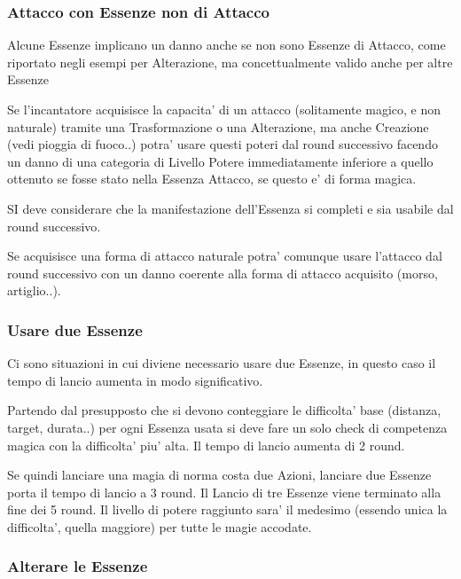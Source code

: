 \documentclass[a4paper,11pt,twoside,openany]{dndbook}
\begin{document}
\label{altre-regole}

\subsubsection{Attacco con Essenze non di Attacco}

Alcune Essenze implicano un danno anche se non sono Essenze di Attacco, come riportato negli esempi per Alterazione, ma concettualmente valido anche per altre Essenze

Se l'incantatore acquisisce la capacita' di un attacco (solitamente magico, e non naturale) tramite una Trasformazione o una Alterazione, ma anche Creazione (vedi pioggia di fuoco..) potra' usare questi poteri dal round successivo facendo un danno di una categoria di Livello Potere immediatamente inferiore a quello ottenuto se fosse stato nella Essenza Attacco, se questo e' di forma magica.

SI deve considerare che la manifestazione dell'Essenza si completi e sia usabile dal round successivo.

Se acquisisce una forma di attacco naturale potra' comunque usare l'attacco dal round successivo con un danno coerente alla forma di attacco acquisito (morso, artiglio..).

\subsubsection{Usare due Essenze}

Ci sono situazioni in cui diviene necessario usare due Essenze, in questo caso il tempo di lancio aumenta in modo significativo.

Partendo dal presupposto che si devono conteggiare le difficolta' base (distanza, target, durata..) per ogni Essenza usata si deve fare un solo check di competenza magica con la difficolta' piu' alta. Il tempo di lancio aumenta di 2 round.

Se quindi lanciare una magia di norma costa due Azioni, lanciare due Essenze porta il tempo di lancio a 3 round. Il Lancio di tre Essenze viene terminato alla fine dei 5 round. Il livello di potere raggiunto sara' il medesimo (essendo unica la difficolta', quella maggiore) per tutte le magie accodate.

\subsubsection{Alterare le Essenze}
\end{document}
